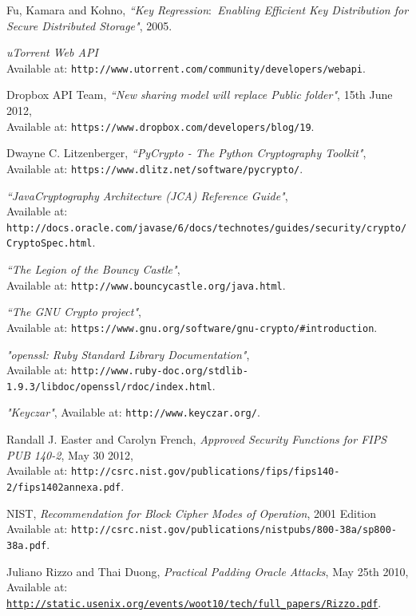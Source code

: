 \documentclass[12pt, titlepage]{article}
\begin{document}
\begin{thebibliography}{10}
Fu, Kamara and Kohno, \emph{``Key Regression$\colon$ Enabling Efficient Key Distribution for Secure Distributed Storage"}, 2005.

\emph{uTorrent Web API}
\\ Available at: \texttt{http://www.utorrent.com/community/developers/webapi}.

Dropbox API Team, \emph{``New sharing model will replace Public folder"},  15th June 2012,
\\ Available at: \texttt{https://www.dropbox.com/developers/blog/19}.

Dwayne C. Litzenberger, \emph{``PyCrypto - The Python Cryptography Toolkit"},
\\ Available at: \texttt{https://www.dlitz.net/software/pycrypto/}.

\emph{``Java\texttrademark Cryptography Architecture (JCA) Reference Guide"},
\\ Available at: \texttt{http://docs.oracle.com/javase/6/docs/technotes/guides/security/crypto/CryptoSpec.html}.

\emph{``The Legion of the Bouncy Castle"},
\\ Available at: \texttt{http://www.bouncycastle.org/java.html}.

\emph{``The GNU Crypto project"},
\\ Available at: \texttt{https://www.gnu.org/software/gnu-crypto/\#introduction}.

\emph{"openssl: Ruby Standard Library Documentation"},
\\ Available at: \texttt{http://www.ruby-doc.org/stdlib-1.9.3/libdoc/openssl/rdoc/index.html}.

\emph{"Keyczar"}, Available at: \texttt{http://www.keyczar.org/}.

Randall J. Easter and Carolyn French, \emph{Approved Security Functions
for FIPS PUB 140-2}, May 30 2012,
\\ Available at: \texttt{http://csrc.nist.gov/publications/fips/fips140-2/fips1402annexa.pdf}.

NIST, \emph{Recommendation for Block Cipher Modes of Operation}, 2001 Edition
\\ Available at: \texttt{http://csrc.nist.gov/publications/nistpubs/800-38a/sp800-38a.pdf}.

Juliano Rizzo and Thai Duong, \emph{Practical Padding Oracle Attacks}, May 25th 2010,
\\ Available at: \texttt{\url{http://static.usenix.org/events/woot10/tech/full_papers/Rizzo.pdf}}.


\end{thebibliography}
\end{document}
